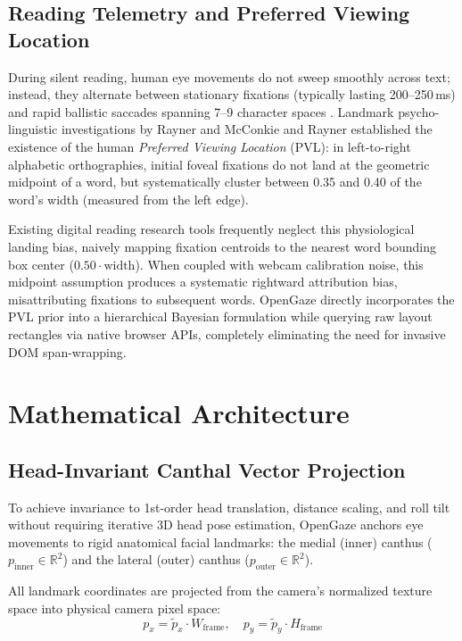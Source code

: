 \documentclass[10pt,twocolumn]{article}
\begin{document}
\subsection{Reading Telemetry and Preferred Viewing Location}
During silent reading, human eye movements do not sweep smoothly across text; instead, they alternate between stationary fixations (typically lasting 200--250\,ms) and rapid ballistic saccades spanning 7--9 character spaces \cite{rayner1998eye,reichle2003ez}. Landmark psycho-linguistic investigations by Rayner \cite{rayner1979preferred} and McConkie and Rayner \cite{mcconkie1979initial} established the existence of the human \textit{Preferred Viewing Location} (PVL): in left-to-right alphabetic orthographies, initial foveal fixations do not land at the geometric midpoint of a word, but systematically cluster between 0.35 and 0.40 of the word's width (measured from the left edge).

Existing digital reading research tools frequently neglect this physiological landing bias, naively mapping fixation centroids to the nearest word bounding box center ($0.50 \cdot \text{width}$). When coupled with webcam calibration noise, this midpoint assumption produces a systematic rightward attribution bias, misattributing fixations to subsequent words. OpenGaze directly incorporates the PVL prior into a hierarchical Bayesian formulation while querying raw layout rectangles via native browser APIs, completely eliminating the need for invasive DOM span-wrapping.

\section{Mathematical Architecture}
\label{sec:math}

\subsection{Head-Invariant Canthal Vector Projection}
\label{subsec:canthal}
To achieve invariance to 1st-order head translation, distance scaling, and roll tilt without requiring iterative 3D head pose estimation, OpenGaze anchors eye movements to rigid anatomical facial landmarks: the medial (inner) canthus ($p_{\text{inner}} \in \mathbb{R}^2$) and the lateral (outer) canthus ($p_{\text{outer}} \in \mathbb{R}^2$).

All landmark coordinates are projected from the camera's normalized texture space into physical camera pixel space:
\begin{equation}
    p_x = \tilde{p}_x \cdot W_{\text{frame}}, \quad p_y = \tilde{p}_y \cdot H_{\text{frame}}
\end{equation}
\end{document}
